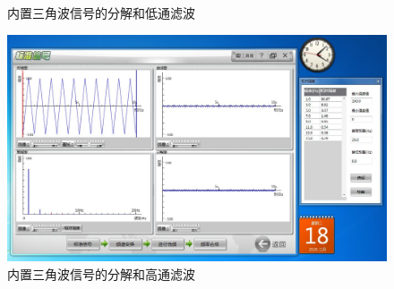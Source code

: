 \documentclass[11pt]{article}
\begin{document}
\begin{enumerate}
\begin{figure}[H]
        \caption{内置三角波信号的分解和低通滤波}
    \end{figure}
    \begin{figure}[H]
        \centering
        \includegraphics[width=15cm]{Fig/图8 内置三角波信号的分解和高通滤波.JPG}
        \caption{内置三角波信号的分解和高通滤波}
    \end{figure}


\end{enumerate}
\end{document}
